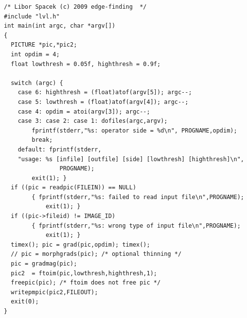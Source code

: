 \documentclass[11pt,twoside,english,a4paper]{article}
\begin{document}

\begin{verbatim}
/* Libor Spacek (c) 2009 edge-finding  */
#include "lvl.h"
int main(int argc, char *argv[])
{
  PICTURE *pic,*pic2;
  int opdim = 4;
  float lowthresh = 0.05f, highthresh = 0.9f;

  switch (argc) {
	case 6: highthresh = (float)atof(argv[5]); argc--;
	case 5: lowthresh = (float)atof(argv[4]); argc--;
	case 4: opdim = atoi(argv[3]); argc--;
	case 3: case 2: case 1: dofiles(argc,argv); 
		fprintf(stderr,"%s: operator side = %d\n", PROGNAME,opdim); 
		break;
	default: fprintf(stderr,
	"usage: %s [infile] [outfile] [side] [lowthresh] [highthresh]\n",
				PROGNAME);
		exit(1); }
  if ((pic = readpic(FILEIN)) == NULL) 
		{ fprintf(stderr,"%s: failed to read input file\n",PROGNAME); 
			exit(1); }
  if ((pic->fileid) != IMAGE_ID)
		{ fprintf(stderr,"%s: wrong type of input file\n",PROGNAME); 
			exit(1); }
  timex(); pic = grad(pic,opdim); timex();
  // pic = morphgrads(pic); /* optional thinning */
  pic = gradmag(pic);
  pic2  = ftoim(pic,lowthresh,highthresh,1); 
  freepic(pic); /* ftoim does not free pic */
  writepmpic(pic2,FILEOUT);
  exit(0);
}
\end{verbatim}
\end{document}
